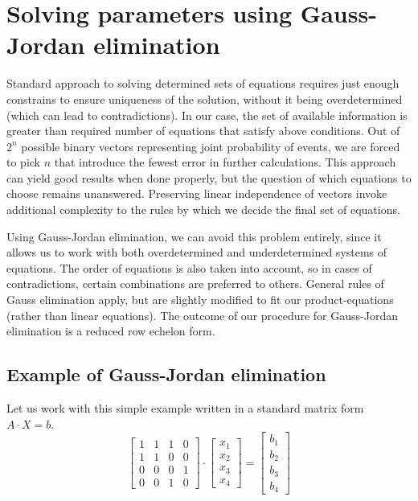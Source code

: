 \section{Solving parameters using Gauss-Jordan elimination}

Standard approach to solving determined sets of equations requires just enough constrains to ensure uniqueness of the solution, without it being overdetermined (which can lead to contradictions).
In our case, the set of available information is greater than required number of equations that satisfy above conditions.
Out of $2^n$ possible binary vectors representing joint probability of events, we are forced to pick $n$ that introduce the fewest error in further calculations.
This approach can yield good results when done properly, but the question of which equations to choose remains unanswered.
Preserving linear independence of vectors invoke additional complexity to the rules by which we decide the final set of equations.

Using Gauss-Jordan elimination, we can avoid this problem entirely, since it allows us to work with both overdetermined and underdetermined systems of equations.
The order of equations is also taken into account, so in cases of contradictions, certain combinations are preferred to others.
General rules of Gauss elimination apply, but are slightly modified to fit our product-equations (rather than linear equations).
The outcome of our procedure for Gauss-Jordan elimination is a reduced row echelon form.

\subsection{Example of Gauss-Jordan elimination}
Let us work with this simple example written in a standard matrix form $A \cdot X = b$.
\begin{equation}
    \begin{bmatrix}
        1 & 1 & 1 & 0 \\
        1 & 1 & 0 & 0 \\
        0 & 0 & 0 & 1 \\
        0 & 0 & 1 & 0
    \end{bmatrix} \cdot
    \begin{bmatrix}
        x_1 \\ x_2 \\ x_3 \\ x_4
    \end{bmatrix} = 
    \begin{bmatrix}
        b_1 \\ b_2 \\ b_3 \\ b_4
    \end{bmatrix}
\end{equation}

